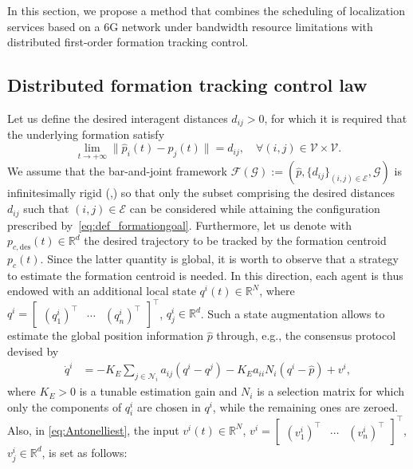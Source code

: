 \documentclass{ifac/ifacconf}
\begin{document}
In this section, we propose a method that combines the scheduling of localization services based on a 6G network under bandwidth resource limitations with distributed first-order formation tracking control.

\subsection{Distributed formation tracking control law}

Let us define the desired interagent distances $d_{ij} > 0$, for which it is required that the underlying formation satisfy
\begin{equation}\label{eq:def_formationgoal}
    \lim_{t\rightarrow +\infty} \| \hat{p}_i(t)-\hat{p}_j(t) \| = d_{ij}, \quad \forall (i,j) \in \mathcal{V} \times \mathcal{V}.  
\end{equation}
We assume that the bar-and-joint framework $\mathcal{F}(\mathcal{G}):=(\hat{p},\{d_{ij}\}_{(i,j)\in \mathcal{E}},\mathcal{G})$ is infinitesimally rigid (\cite{de2019formation},) so that only the subset comprising the desired distances $d_{ij}$ such that $(i,j) \in \mathcal{E}$ can be considered while attaining the configuration prescribed by~\eqref{eq:def_formationgoal}.
Furthermore, let us denote with $p_{c,\text{des}}(t)\in \mathbb{R}^d$ the desired trajectory to be tracked by the formation centroid $p_c(t)$. Since the latter quantity is global, it is worth to observe that a strategy to estimate the formation centroid is needed. In this direction, each agent is thus endowed with an additional local state $q^i(t) \in \mathbb{R}^N$, where $q^i = \begin{bmatrix}
    (q_1^i)^\top  & \cdots & (q_n^i)^\top
\end{bmatrix}^\top$, $q_j^i \in \mathbb{R}^d$. Such a state augmentation allows to estimate the global position information $\hat{p}$ through, e.g., the consensus protocol devised by \cite{antonelli2012decentralized} 
\begin{align}\label{eq:Antonelliest}
        \dot{q}^i &= -K_E \sum_{j\in \mathcal{N}_i} a_{ij} (q^i-q^j) - K_E a_{ii} N_i(q^i - \hat{p}) + v^i ,
\end{align}
where $K_E > 0$ is a tunable estimation gain and $N_i$ is a selection matrix for which only the components of $q^i_i$ are chosen in $q^i$, while the remaining ones are zeroed. Also, in \eqref{eq:Antonelliest}, the input
 $v^i(t)\in \mathbb{R}^N$, $v^i = \begin{bmatrix}
    (v^i_1)^\top & \cdots & (v^i_n)^\top
\end{bmatrix}^\top$, $v_j^i \in \mathbb{R}^d$, is set as follows:
\end{document}

